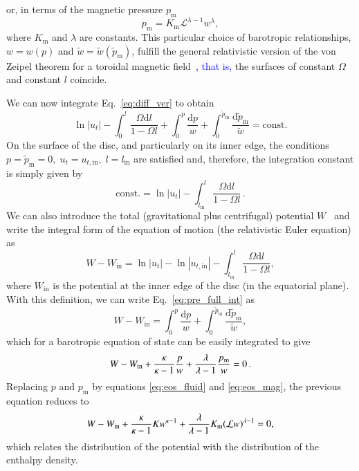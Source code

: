 \documentclass{aa}
\newcommand{\sg}[1]{\textcolor{blue}{#1}}
\begin{document}
or, in terms of the magnetic pressure $p_{\mathrm{m}}$
\begin{equation}\label{eq:eos_mag}
p_{\mathrm{m}} = K_{\mathrm{m}} \mathcal{L}^{\lambda
-1} w^{\lambda
},
\end{equation}
where $K_{\mathrm{m}}$ and $\lambda
$ are constants.
This particular choice of barotropic relationships, $w = w(p)$ and $\tilde{w} = \tilde{w}(\tilde{p}_{\mathrm{m}})$, fulfill the general relativistic version of the von Zeipel theorem for a toroidal magnetic field~\citep{vonZeipel:1924, Zanotti:2015}, \sg{that is,} the surfaces of constant $\Omega$ and constant $l$ coincide.

We can now integrate Eq.~\eqref{eq:diff_ver} to obtain
\begin{equation}\label{eq:pre_full_int}
\ln |u_t| - \int^l_0 \frac{\Omega \mathrm{d}l}{1 - \Omega l} + \int^p_0 \frac{\mathrm{d}p}{w} + \int_0^{\tilde{p}_{\mathrm{m}}} \frac{\mathrm{d}\tilde{p}_{\mathrm{m}}}{\tilde{w}} = \mathrm{const}.
\end{equation}
On the surface of the disc, and particularly on its inner edge, the conditions
$p = \tilde{p}_{\mathrm{m}} = 0, \; u_t = u_{t, \mathrm{in}}, \; l = l_{\mathrm{in}}$
are satisfied and, therefore, the integration constant is simply given by
\begin{equation}
\mathrm{const.} = \ln |u_t| - \int^l_{l_\mathrm{in}} \frac{\Omega \mathrm{d}l}{1 - \Omega l}\,.
\end{equation}
We can also introduce the total (gravitational plus centrifugal) potential $W$~\citep{Abramowicz:1978} and write the integral form of the equation of motion (the relativistic Euler equation) as
\begin{equation}\label{eq:potential}
W - W_{\mathrm{in}} = \ln|u_t| - \ln|u_{t,\mathrm{in}}| - \int^{l}_{l_{\mathrm{in}}} \frac{\Omega \mathrm{d}l}{1 - \Omega l},
\end{equation}
where $W_{\mathrm{in}}$ is the potential at the inner edge of the disc (in the equatorial plane). With this definition, we can write Eq.~\eqref{eq:pre_full_int} as
\begin{equation}\label{eq:full_int}
W - W_{\mathrm{in}} = \int^p_0 \frac{\mathrm{d}p}{w} + \int_0^{\tilde{p}_{\mathrm{m}}} \frac{\mathrm{d}\tilde{p}_{\mathrm{m}}}{\tilde{w}},
\end{equation}
which for a barotropic equation of state can be easily integrated to give
\begin{equation}\label{eq:pre_enthalpy_eq}
W - W_{\rm{in}} + \frac{\kappa}{\kappa - 1}\frac{p}{w} + \frac{\lambda
}{\lambda
 - 1}\frac{p_{\mathrm{m}}}{w} = 0\,.
\end{equation}
Replacing $p$ and $p_{\mathrm{m}}$ by equations \eqref{eq:eos_fluid} and \eqref{eq:eos_mag}, the previous equation reduces to
\begin{equation}\label{eq:enthalpy_eq}
W - W_{\rm{in}} + \frac{\kappa}{\kappa - 1} K w^{\kappa - 1} + \frac{\lambda
}{\lambda
 - 1}K_{\mathrm{m}}(\mathcal{L} w)^{\lambda
 - 1} = 0,
\end{equation}
which relates the distribution of the potential with the distribution of the enthalpy density.
\end{document}
